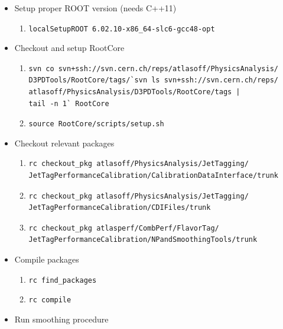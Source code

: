 \begin{itemize}
\itemsep1pt\parskip0pt
\item
  Setup proper ROOT version (needs C++11)

  \begin{enumerate}
  \def\labelenumi{\arabic{enumi}.}
  \itemsep1pt\parskip0pt
  \item
    \texttt{localSetupROOT 6.02.10-x86\_64-slc6-gcc48-opt}
  \end{enumerate}
\item
  Checkout and setup RootCore

  \begin{enumerate}
  \def\labelenumi{\arabic{enumi}.}
  \item
\begin{verbatim}
svn co svn+ssh://svn.cern.ch/reps/atlasoff/PhysicsAnalysis/
D3PDTools/RootCore/tags/`svn ls svn+ssh://svn.cern.ch/reps/
atlasoff/PhysicsAnalysis/D3PDTools/RootCore/tags | 
tail -n 1` RootCore
\end{verbatim}
  \item
    \texttt{source RootCore/scripts/setup.sh}
  \end{enumerate}
\item
  Checkout relevant packages

  \begin{enumerate}
  \item
\begin{verbatim}
rc checkout_pkg atlasoff/PhysicsAnalysis/JetTagging/
JetTagPerformanceCalibration/CalibrationDataInterface/trunk
\end{verbatim}
  \item
\begin{verbatim}
rc checkout_pkg atlasoff/PhysicsAnalysis/JetTagging/
JetTagPerformanceCalibration/CDIFiles/trunk
\end{verbatim}
  \item
\begin{verbatim}
rc checkout_pkg atlasperf/CombPerf/FlavorTag/
JetTagPerformanceCalibration/NPandSmoothingTools/trunk
\end{verbatim}
  \end{enumerate}
\item
  Compile packages

  \begin{enumerate}
  \itemsep1pt\parskip0pt
  \item
    \texttt{rc find\_packages}
  \item
    \texttt{rc compile}
  \end{enumerate}
\item
  Run smoothing procedure


\end{itemize}
